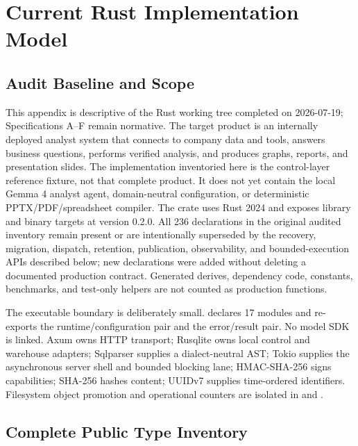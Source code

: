 \clearpage
\section{Current Rust Implementation Model}

\subsection{Audit Baseline and Scope}

This appendix is descriptive of the Rust working tree completed on 2026-07-19; Specifications A--F remain normative. The target product is an internally deployed analyst system that connects to company data and tools, answers business questions, performs verified analysis, and produces graphs, reports, and presentation slides. The implementation inventoried here is the control-layer reference fixture, not that complete product. It does not yet contain the local Gemma 4 analyst agent, domain-neutral configuration, or deterministic PPTX/PDF/spreadsheet compiler. The crate uses Rust 2024 and exposes library and binary targets at version 0.2.0. All 236 declarations in the original audited inventory remain present or are intentionally superseded by the recovery, migration, dispatch, retention, publication, observability, and bounded-execution APIs described below; new declarations were added without deleting a documented production contract. Generated derives, dependency code, constants, benchmarks, and test-only helpers are not counted as production functions.

The executable boundary is deliberately small.  declares 17 modules and re-exports the runtime/configuration pair and the error/result pair. No model SDK is linked. Axum owns HTTP transport; Rusqlite owns local control and warehouse adapters; Sqlparser supplies a dialect-neutral AST; Tokio supplies the asynchronous server shell and bounded blocking lane; HMAC-SHA-256 signs capabilities; SHA-256 hashes content; UUIDv7 supplies time-ordered identifiers. Filesystem object promotion and operational counters are isolated in  and .

\subsection{Complete Public Type Inventory}

